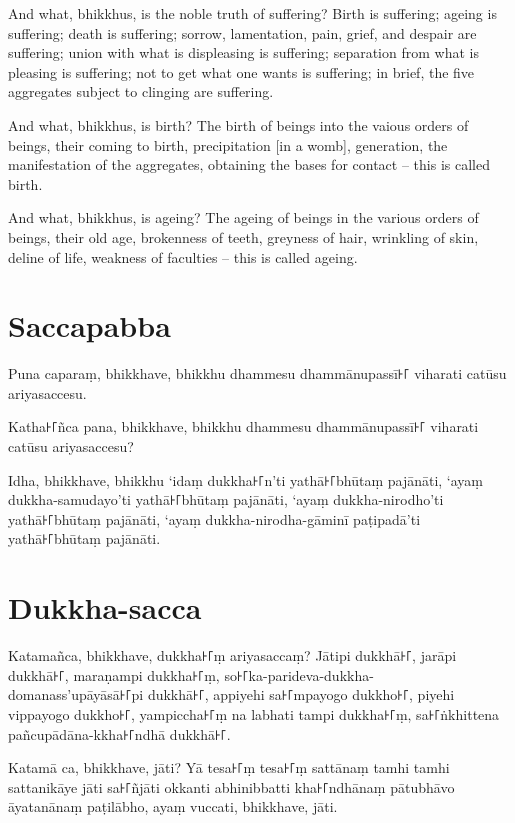 And what, bhikkhus, is the noble truth of suffering? Birth is suffering; ageing
is suffering; death is suffering; sorrow, lamentation, pain, grief, and despair
are suffering; union with what is displeasing is suffering; separation from what
is pleasing is suffering; not to get what one wants is suffering; in brief, the
five aggregates subject to clinging are suffering.

And what, bhikkhus, is birth? The birth of beings into the vaious orders of
beings, their coming to birth, precipitation [in a womb], generation, the
manifestation of the aggregates, obtaining the bases for contact -- this is
called birth.

And what, bhikkhus, is ageing? The ageing of beings in the various orders of
beings, their old age, brokenness of teeth, greyness of hair, wrinkling of skin,
deline of life, weakness of faculties -- this is called ageing.

\paliPage

\section*{Saccapabba}

Puna caparaṃ, bhikkhave, bhikkhu dhammesu dhammānupassī꜔꜒ viharati catūsu
ariyasaccesu.

Katha꜔꜒ñca pana, bhikkhave, bhikkhu dhammesu dhammānupassī꜔꜒ viharati catūsu
ariyasaccesu?

Idha, bhikkhave, bhikkhu ‘idaṃ dukkha꜔꜒n’ti yathā꜔꜒bhūtaṃ pajānāti, ‘ayaṃ
dukkha-samudayo’ti yathā꜔꜒bhūtaṃ pajānāti, ‘ayaṃ dukkha-nirodho’ti yathā꜔꜒bhūtaṃ
pajānāti, ‘ayaṃ dukkha-nirodha-gāminī paṭipadā’ti yathā꜔꜒bhūtaṃ pajānāti.

\section*{Dukkha-sacca}

Katamañca, bhikkhave, dukkha꜔꜒ṃ ariyasaccaṃ? Jātipi dukkhā꜔꜒, jarāpi dukkhā꜔꜒,
maraṇampi dukkha꜔꜒ṃ, so꜔꜒ka-parideva-dukkha-\\ domanass'upāyāsā꜔꜒pi dukkhā꜔꜒, appiyehi
sa꜔꜒mpayogo dukkho꜔꜒, piyehi vippayogo dukkho꜔꜒, yampiccha꜔꜒ṃ na labhati tampi dukkha꜔꜒ṃ,
sa꜔꜒ṅkhittena pañcupādāna-kkha꜔꜒ndhā dukkhā꜔꜒.

Katamā ca, bhikkhave, jāti? Yā tesa꜔꜒ṃ tesa꜔꜒ṃ sattānaṃ tamhi tamhi sattanikāye jāti
sa꜔꜒ñjāti okkanti abhinibbatti kha꜔꜒ndhānaṃ pātubhāvo āyatanānaṃ paṭilābho, ayaṃ
vuccati, bhikkhave, jāti.

